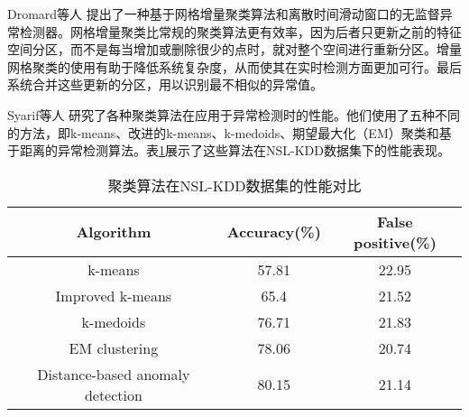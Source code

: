 Dromard等人\cite{dromard2016online} 提出了一种基于网格增量聚类算法和离散时间滑动窗口的无监督异常检测器。网格增量聚类比常规的聚类算法更有效率，因为后者只更新之前的特征空间分区，而不是每当增加或删除很少的点时，就对整个空间进行重新分区。增量网格聚类的使用有助于降低系统复杂度，从而使其在实时检测方面更加可行。最后系统合并这些更新的分区，用以识别最不相似的异常值。


Syarif等人\cite{2012syarif} 研究了各种聚类算法在应用于异常检测时的性能。他们使用了五种不同的方法，即k-means、改进的k-means、k-medoids、期望最大化（EM）聚类和基于距离的异常检测算法。表\ref{聚类算法}展示了这些算法在NSL-KDD数据集下的性能表现。

\begin{table}[]
  \caption{聚类算法在NSL-KDD数据集的性能对比}
  \label{聚类算法}
    \centering
    \begin{tabular}{@{}clllclcl@{}}
    \toprule
    \multicolumn{4}{c}{Algorithm}                          & \multicolumn{2}{c}{Accuracy(\%)} & \multicolumn{2}{c}{False positive(\%)} \\ \midrule
    \multicolumn{4}{c}{k-means}                            & \multicolumn{2}{c}{57.81}        & \multicolumn{2}{c}{22.95}              \\
    \multicolumn{4}{c}{Improved k-means}                   & \multicolumn{2}{c}{65.4}         & \multicolumn{2}{c}{21.52}              \\
    \multicolumn{4}{c}{k-medoids}                          & \multicolumn{2}{c}{76.71}        & \multicolumn{2}{c}{21.83}              \\
    \multicolumn{4}{c}{EM clustering}                      & \multicolumn{2}{c}{78.06}        & \multicolumn{2}{c}{20.74}              \\
    \multicolumn{4}{c}{Distance-based   anomaly detection} & \multicolumn{2}{c}{80.15}        & \multicolumn{2}{c}{21.14}              \\ \bottomrule
    \end{tabular}
    \end{table}



